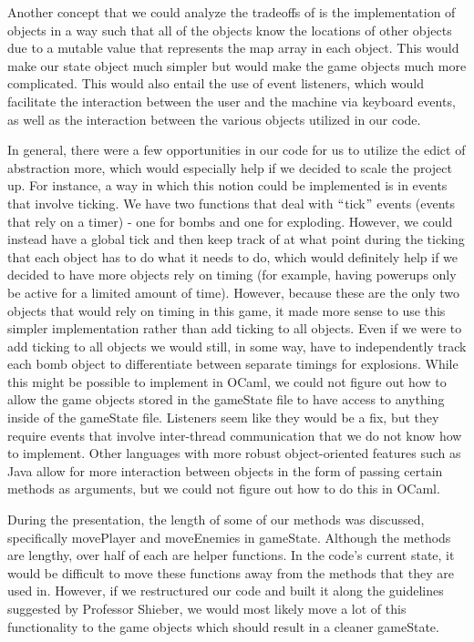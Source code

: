 \documentclass[12pt]{article}
\begin{document}
\vspace{\baselineskip}
Another concept that we could analyze the tradeoffs of is the implementation of objects in a way such that all of the objects know the locations of other objects due to a mutable value that represents the map array in each object. This would make our state object much simpler but would make the game objects much more complicated. This would also entail the use of event listeners, which would facilitate the interaction between the user and the machine via keyboard events, as well as the interaction between the various objects utilized in our code. \par


\vspace{\baselineskip}
In general, there were a few opportunities in our code for us to utilize the edict of abstraction more, which would especially help if we decided to scale the project up. For instance, a way in which this notion could be implemented is in events that involve ticking. We have two functions that deal with $``$tick$"$  events (events that rely on a timer) - one for bombs and one for exploding. However, we could instead have a global tick and then keep track of at what point during the ticking that each object has to do what it needs to do, which would definitely help if we decided to have more objects rely on timing (for example, having powerups only be active for a limited amount of time). However, because these are the only two objects that would rely on timing in this game, it made more sense to use this simpler implementation rather than add ticking to all objects. Even if we were to add ticking to all objects we would still, in some way, have to independently track each bomb object to differentiate between separate timings for explosions. While this might be possible to implement in OCaml, we could not figure out how to allow the game objects stored in the gameState file to have access to anything inside of the gameState file. Listeners seem like they would be a fix, but they require events that involve inter-thread communication that we do not know how to implement. Other languages with more robust object-oriented features such as Java allow for more interaction between objects in the form of passing certain methods as arguments, but we could not figure out how to do this in OCaml.\par


\vspace{\baselineskip}
During the presentation, the length of some of our methods was discussed, specifically movePlayer and moveEnemies in gameState. Although the methods are lengthy, over half of each are helper functions. In the code’s current state, it would be difficult to move these functions away from the methods that they are used in. However, if we restructured our code and built it along the guidelines suggested by Professor Shieber, we would most likely move a lot of this functionality to the game objects which should result in a cleaner gameState.\par
\end{document}
